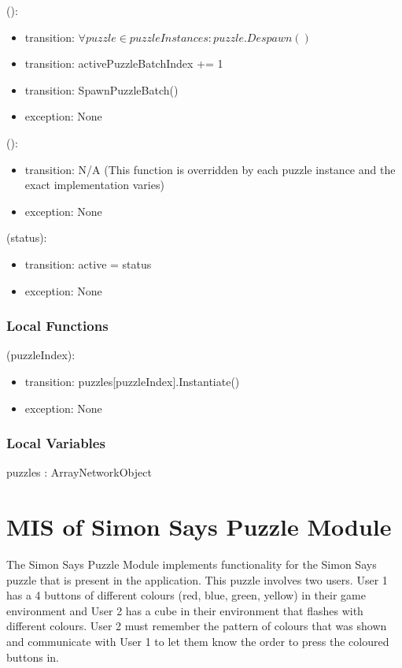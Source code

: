\documentclass[12pt, titlepage]{article}
\begin{document}
():
\begin{itemize}
\item transition: $\forall puzzle \in puzzleInstances : puzzle.Despawn()$
\item transition: activePuzzleBatchIndex += 1
\item transition: SpawnPuzzleBatch()
\item exception: None
\end{itemize}

():
\begin{itemize}
\item transition: N/A (This function is overridden by each puzzle instance and the exact implementation varies)
\item exception: None
\end{itemize}

(status):
\begin{itemize}
\item transition: active = status
\item exception: None
\end{itemize}

\subsubsection{Local Functions}

(puzzleIndex):
\begin{itemize}
\item transition: puzzles[puzzleIndex].Instantiate()
\item exception: None
\end{itemize}

\subsubsection{Local Variables}

puzzles : Array\textlangle NetworkObject\textrangle

\newpage

\section{MIS of Simon Says Puzzle Module} \label{sec:Simon}

\noindent The Simon Says Puzzle Module implements functionality for the Simon Says puzzle that is present in the application. This puzzle involves two users. User 1 has a 4 buttons of different colours (red, blue, green, yellow) in their game environment and User 2 has a cube in their environment that flashes with different colours. User 2 must remember the pattern of colours that was shown and communicate with User 1 to let them know the order to press the coloured buttons in.
\end{document}
